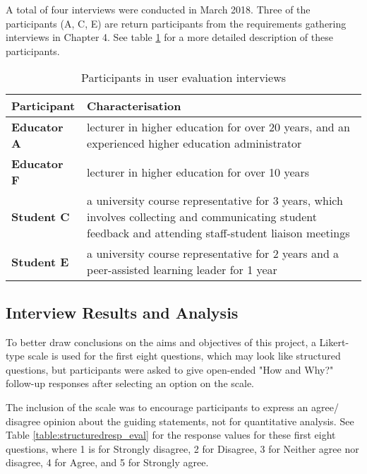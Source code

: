 A total of four interviews were conducted in March 2018.
Three of the participants (A, C, E) are return participants from the requirements gathering interviews in Chapter 4.
See table \ref{table:participants-eval} for a more detailed description of these participants.

\begin{table}[!h]
	\caption{Participants in user evaluation interviews}
	\centering
	\label{table:participants-eval}
	\begin{tabularx}{\textwidth}{>{\bfseries}lX}
		Participant & Characterisation                                                                    \\
		\toprule
		Educator A  & lecturer in higher education for over 20 years, and an experienced higher education
		administrator                                                                                     \\\midrule
		Educator F  & lecturer in higher education for over 10 years                                      \\\midrule
		Student C   & a university course representative for 3 years, which involves collecting and
		communicating student feedback and attending staff-student liaison meetings                       \\\midrule
		Student E   & a university course representative for 2 years and a peer-assisted learning leader
		for 1 year                                                                                        \\\bottomrule
	\end{tabularx}
\end{table}

\subsection{Interview Results and Analysis}

To better draw conclusions on the aims and objectives of this project, 
a Likert-type scale is used for the first eight questions, 
which may look like structured questions, but participants were asked to give 
open-ended "How and Why?" follow-up responses after selecting an option on the scale. 

The inclusion of the scale was to encourage participants to express an agree/ disagree opinion 
about the guiding statements, not for quantitative analysis. 
See Table \ref{table:structuredresp_eval} for 
the response values for these first eight questions,
where 1 is for Strongly disagree, 2 for Disagree, 3 for Neither agree nor disagree, 
4 for Agree, and 5 for Strongly agree.

